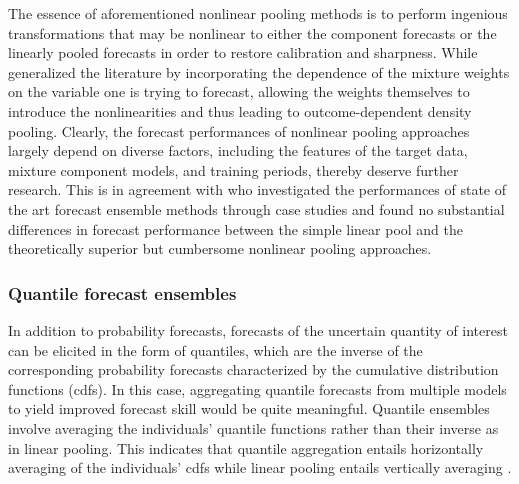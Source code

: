 \documentclass[11pt]{article}
\begin{document}
The essence of aforementioned nonlinear pooling methods is to perform ingenious transformations that may be nonlinear to either the component forecasts or the linearly pooled forecasts in order to restore calibration and sharpness. While \cite{Kapetanios2015-bb} generalized the literature by incorporating the dependence of the mixture weights on the variable one is trying to forecast, allowing the weights themselves to introduce the nonlinearities and thus leading to outcome-dependent density pooling. Clearly, the forecast performances of nonlinear pooling approaches largely depend on diverse factors, including the features of the target data, mixture component models, and training periods, thereby deserve further research. This is in agreement with \cite{Baran2018-nm} who investigated the performances of state of the art forecast ensemble methods through case studies and found no substantial differences in forecast performance between the simple linear pool and the theoretically superior but cumbersome nonlinear pooling approaches.

\subsubsection{Quantile forecast ensembles}
\label{sec:quantile_forecast_ensembles}

In addition to probability forecasts, forecasts of the uncertain quantity of interest can be elicited in the form of quantiles, which are the inverse of the corresponding probability forecasts characterized by the cumulative distribution functions (cdfs). In this case, aggregating quantile forecasts from multiple models to yield improved forecast skill would be quite meaningful. Quantile ensembles involve averaging the individuals' quantile functions rather than their inverse as in linear pooling. This indicates that quantile aggregation entails horizontally averaging of the individuals' cdfs while linear pooling entails vertically averaging \citep{Lichtendahl2013-rt}.
\end{document}

